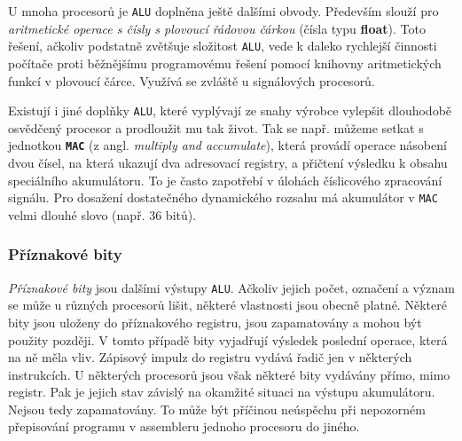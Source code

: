       
      U mnoha procesorů je \texttt{ALU} doplněna ještě dalšími obvody. Především slouží pro 
      \emph{aritmetické operace  s čísly s plovoucí řádovou čárkou} (čísla typu \textbf{float}). 
      Toto řešení, ačkoliv podstatně zvětšuje složitost \texttt{ALU}, vede k daleko rychlejší 
      činnosti počítače proti běžnějšímu programovému řešení pomocí kni\-hov\-ny aritmetických 
      funkcí v 
      plovoucí čárce. Využívá se zvláště u signálových procesorů.
      
      Existují i jiné doplňky \texttt{ALU}, které vyplývají ze snahy výrobce vylepšit dlouhodobě 
      osvědčený procesor a prodloužit mu tak život. Tak se např. můžeme setkat s jednotkou 
      \textbf{\texttt{MAC}} (z angl. \emph{multiply and accumulate}), která provádí operace 
      násobení dvou čísel, na která ukazují dva adresovací registry, a přičtení výsledku k obsahu 
      speciálního akumulátoru. To je často zapotřebí v úlohách číslicového zpracování signálu. Pro 
      dosažení dostatečného dynamického rozsahu má akumulátor v \texttt{MAC} velmi dlouhé slovo 
      (např. 36 bitů).
      
      \subsubsection{Příznakové bity}
        \emph{Příznakové bity} jsou dalšími výstupy \texttt{ALU}. Ačkoliv jejich počet, označení a 
        význam se může u různých procesorů lišit, některé vlastnosti jsou obecně platné. Některé 
        bity jsou uloženy do příznakového registru, jsou zapamatovány a mohou být použity později. 
        V tomto případě bity vyjadřují výsledek poslední operace, která na ně měla vliv. Zápisový 
        impulz do registru vydává řadič jen v některých instrukcích. U některých procesorů jsou 
        však některé bity vydávány přímo, mimo registr. Pak je jejich stav závislý na okamžité 
        situaci na výstupu akumulátoru. Nejsou tedy zapamatovány. To může být příčinou neúspěchu 
        při nepozorném přepisování programu v assembleru jednoho procesoru do jiného.
        

